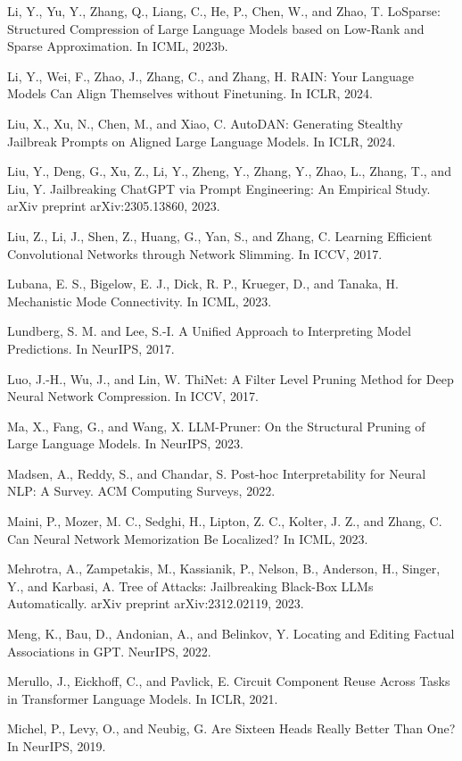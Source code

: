 \documentclass[10pt]{article}
\begin{document}
Li, Y., Yu, Y., Zhang, Q., Liang, C., He, P., Chen, W., and Zhao, T. LoSparse: Structured Compression of Large Language Models based on Low-Rank and Sparse Approximation. In ICML, 2023b.

Li, Y., Wei, F., Zhao, J., Zhang, C., and Zhang, H. RAIN: Your Language Models Can Align Themselves without Finetuning. In ICLR, 2024.

Liu, X., Xu, N., Chen, M., and Xiao, C. AutoDAN: Generating Stealthy Jailbreak Prompts on Aligned Large Language Models. In ICLR, 2024.

Liu, Y., Deng, G., Xu, Z., Li, Y., Zheng, Y., Zhang, Y., Zhao, L., Zhang, T., and Liu, Y. Jailbreaking ChatGPT via Prompt Engineering: An Empirical Study. arXiv preprint arXiv:2305.13860, 2023.

Liu, Z., Li, J., Shen, Z., Huang, G., Yan, S., and Zhang, C. Learning Efficient Convolutional Networks through Network Slimming. In ICCV, 2017.

Lubana, E. S., Bigelow, E. J., Dick, R. P., Krueger, D., and Tanaka, H. Mechanistic Mode Connectivity. In ICML, 2023.

Lundberg, S. M. and Lee, S.-I. A Unified Approach to Interpreting Model Predictions. In NeurIPS, 2017.

Luo, J.-H., Wu, J., and Lin, W. ThiNet: A Filter Level Pruning Method for Deep Neural Network Compression. In ICCV, 2017.

Ma, X., Fang, G., and Wang, X. LLM-Pruner: On the Structural Pruning of Large Language Models. In NeurIPS, 2023.

Madsen, A., Reddy, S., and Chandar, S. Post-hoc Interpretability for Neural NLP: A Survey. ACM Computing Surveys, 2022.

Maini, P., Mozer, M. C., Sedghi, H., Lipton, Z. C., Kolter, J. Z., and Zhang, C. Can Neural Network Memorization Be Localized? In ICML, 2023.

Mehrotra, A., Zampetakis, M., Kassianik, P., Nelson, B., Anderson, H., Singer, Y., and Karbasi, A. Tree of Attacks: Jailbreaking Black-Box LLMs Automatically. arXiv preprint arXiv:2312.02119, 2023.

Meng, K., Bau, D., Andonian, A., and Belinkov, Y. Locating and Editing Factual Associations in GPT. NeurIPS, 2022.

Merullo, J., Eickhoff, C., and Pavlick, E. Circuit Component Reuse Across Tasks in Transformer Language Models. In ICLR, 2021.

Michel, P., Levy, O., and Neubig, G. Are Sixteen Heads Really Better Than One? In NeurIPS, 2019.
\end{document}
